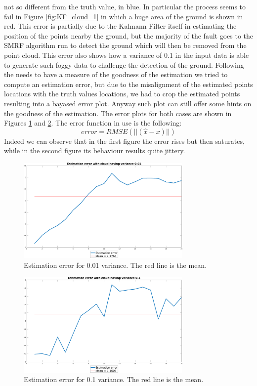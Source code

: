 \documentclass[twocolumn, a4paper]{article}
\begin{document}
not so different from the truth value, in blue. In particular the process
seems to fail in Figure \ref{fig:KF_cloud_1} in which a huge area of the
ground is shown in red. This error is partially due to the Kalmann Filter
itself in estimating the position of the points nearby the ground, but the
majority of the fault goes to the SMRF algorithm run to detect the ground
which will then be removed from the point cloud. This error also shows how
a variance of 0.1 in the input data is able to generate such foggy data to
challenge the detection of the ground.
Following the needs to have a measure of the goodness of the estimation
we tried to compute an estimation error, but due to the misalignment of the
estimated points locations with the truth values locations, we had to crop
the estimated points resulting into a bayased error plot. Anyway such plot
can still offer some hints on the goodness of the estimation.
The error plots for both cases are shown in Figures \ref{fig:KF_err_01} and
\ref{fig:KF_err_1}. The error function in use is the following:
\begin{equation}
    error = RMSE(||(\hat{x} - x)||)
\end{equation}
Indeed we can observe that in the first figure the error rises but then 
saturates, while in the second figure its behaviour results quite jittery.
\vfill
\begin{figure}[h!]
    \centering
    \includegraphics[width=8.5cm]{"../Report_images/Denoising_KF_cloud01_error.png"}
    \caption{Estimation error for 0.01 variance. The red line is the mean.}
    \label{fig:KF_err_01}
\end{figure}
\vspace{0.3cm}
\begin{figure}[h!]
    \centering
    \includegraphics[width=8.5cm]{"../Report_images/Denoising_KF_cloud1_error.png"}
    \caption{Estimation error for 0.1 variance. The red line is the mean.}
    \label{fig:KF_err_1}
\end{figure}
\end{document}
